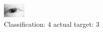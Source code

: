 \begin{figure}[h!]
\begin{center}
\includegraphics[width=0.60\columnwidth]{figures/ID18_class_4_target_3.png}
\end{center}
\caption{ Classification: 4 actual target: 3}
\label{fig:ID18_class_4_target_3}
\end{figure}
